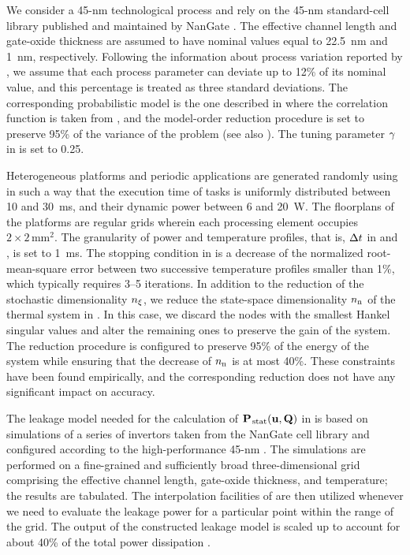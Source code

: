 We consider a 45-nm technological process and rely on the 45-nm standard-cell library published and maintained by NanGate \cite{nangate}.
The effective channel length and gate-oxide thickness are assumed to have nominal values equal to 22.5~nm and 1~nm, respectively.
Following the information about process variation reported by  \cite{itrs}, we assume that each process parameter can deviate up to 12\% of its nominal value, and this percentage is treated as three standard deviations.
The corresponding probabilistic model is the one described in  where the correlation function is taken from \cite{ukhov2014}, and the model-order reduction procedure is set to preserve 95\% of the variance of the problem (see also ).
The tuning parameter $\gamma$ in  is set to 0.25.

Heterogeneous platforms and periodic applications are generated randomly using  \cite{dick1998} in such a way that the execution time of tasks is uniformly distributed between 10 and 30~ms, and their dynamic power between 6 and 20~W.
The floorplans of the platforms are regular grids wherein each processing element occupies $2 \times 2\,\text{mm}^2$.
The granularity of power and temperature profiles, that is, $\Delta t$ in  and , is set to 1~ms.
The stopping condition in  is a decrease of the normalized root-mean-square error between two successive temperature profiles smaller than 1\%, which typically requires 3--5 iterations.
In addition to the reduction of the stochastic dimensionality ${n_\xi}$, we reduce the state-space dimensionality ${n_\text{n}}$ of the thermal system in .
In this case, we discard the nodes with the smallest Hankel singular values and alter the remaining ones to preserve the  gain of the system.
The reduction procedure is configured to preserve 95\% of the energy of the system while ensuring that the decrease of ${n_\text{n}}$ is at most 40\%.
These constraints have been found empirically, and the corresponding reduction does not have any significant impact on accuracy.

The leakage model needed for the calculation of $\mathbf{P}_{\text{\kern0.1emstat}}(\mathbf{u}, \mathbf{Q})$ in  is based on  simulations of a series of  invertors taken from the NanGate cell library and configured according to the high-performance 45-nm  \cite{ptm}.
The simulations are performed on a fine-grained and sufficiently broad three-dimensional grid comprising the effective channel length, gate-oxide thickness, and temperature; the results are tabulated.
The interpolation facilities of  \cite{matlab} are then utilized whenever we need to evaluate the leakage power for a particular point within the range of the grid.
The output of the constructed leakage model is scaled up to account for about 40\% of the total power dissipation \cite{liu2007}.

